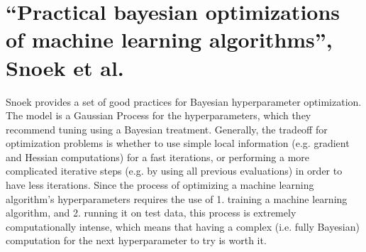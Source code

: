 \documentclass[12pt]{article}
\theoremstyle{plain}
\begin{document}
\section{``Practical bayesian optimizations of machine learning algorithms'', Snoek et al.}


Snoek provides a set of good practices for Bayesian hyperparameter optimization. The model is a Gaussian Process for the hyperparameters, which they recommend tuning using a Bayesian treatment. Generally, the tradeoff for optimization problems is whether to use simple local information (e.g. gradient and Hessian computations) for a fast iterations, or performing a more complicated iterative steps (e.g. by using all previous evaluations) in order to have less iterations. Since the process of optimizing a machine learning algorithm's hyperparameters requires the use of 1. training a machine learning algorithm, and 2. running it on test data, this process is extremely computationally intense, which means that having a complex (i.e. fully Bayesian) computation for the next hyperparameter to try is worth it.




\end{document}
